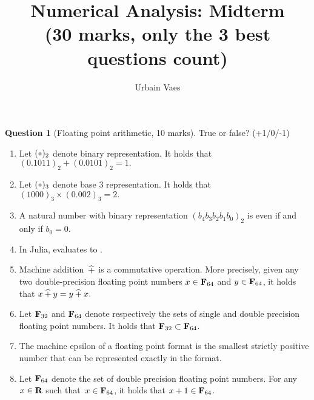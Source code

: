 \documentclass[11pt]{article}
\theoremstyle{definition}
\newtheorem{question}{Question}
\theoremstyle{remark}
\begin{document}
\title{Numerical Analysis: Midterm \\
\small{(\textbf{30 marks}, only the 3 best questions count)}}
\author{Urbain Vaes}
\maketitle

\begin{question}
    [Floating point arithmetic, 10 marks]
    True or false? (+1/0/-1)
    \begin{enumerate}
        \item
            Let $(\placeholder)_2$ denote binary representation.
            It holds that
            \(
                (0.1011)_2 + (0.0101)_2 = 1.
            \)

        \item
            Let $(\placeholder)_3$ denote base 3 representation.
            It holds that
            \(
                (1000)_3 \times (0.002)_3 = 2.
            \)

        \item
            A natural number with binary representation $(b_4 b_3 b_2 b_1 b_0)_2$ is even if and only if $b_0 = 0$.

        \item
            In Julia,  evaluates to .

        \item
            Machine addition~$\mathbin{\widehat +}$ is a commutative operation.
            More precisely, given any two double-precision floating point numbers $x \in \mathbf F_{64}$ and $y \in \mathbf F_{64}$,
            it holds that
            \(
                x \mathbin{\widehat +} y = y \mathbin{\widehat +} x.
            \)

        \item
            Let $\mathbf F_{32}$ and $\mathbf F_{64}$ denote respectively the sets of single and double precision floating point numbers.
            It holds that $\mathbf F_{32} \subset \mathbf F_{64}$.

        \item
            The machine epsilon of a floating point format is the smallest strictly positive number that can be represented exactly in the format.

        \item
            Let $\mathbf F_{64}$ denote the set of double precision floating point numbers.
            For any $x \in \mathbf R$ such that~$x \in \mathbf F_{64}$,
            it holds that $x + 1 \in \mathbf F_{64}$.


\end{enumerate}
\end{question}
\end{document}
